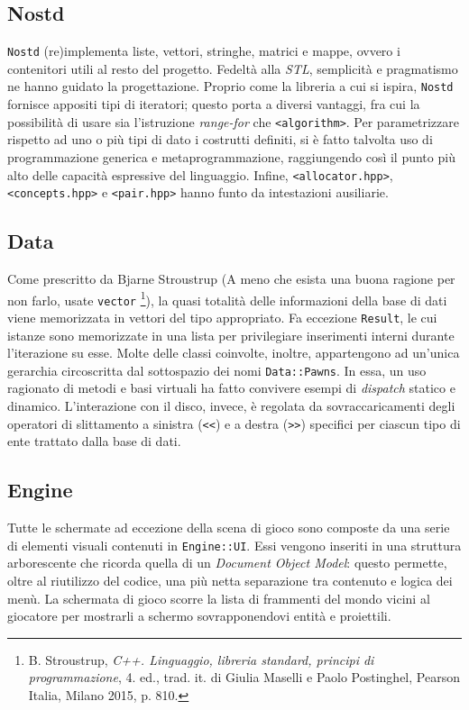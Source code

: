 \documentclass[a4paper]{article}
\begin{document}
\subsection{Nostd}

\verb!Nostd! (re)implementa liste, vettori, stringhe, matrici e mappe, ovvero i
contenitori utili al resto del progetto. Fedelt\`a alla \emph{STL}, semplicit\`a
e pragmatismo ne hanno guidato la progettazione. Proprio come la libreria a cui
si ispira, \verb!Nostd! fornisce appositi tipi di iteratori; questo porta a
diversi vantaggi, fra cui la possibilit\`a di usare sia l'istruzione
\emph{range-for} che \verb!<algorithm>!. Per parametrizzare rispetto ad uno o
pi\`u tipi di dato i costrutti definiti, si \`e fatto talvolta uso di
programmazione generica e metaprogrammazione, raggiungendo cos\`i il punto pi\`u
alto delle capacit\`a espressive del linguaggio. Infine, \verb!<allocator.hpp>!,
\verb!<concepts.hpp>! e \verb!<pair.hpp>! hanno funto da intestazioni
ausiliarie.

\subsection{Data}

Come prescritto da Bjarne Stroustrup (\guillemotleft A meno che esista una buona
ragione per non farlo, usate \verb!vector! \guillemotright \footnote{
\label{note2} B. Stroustrup, \emph{C++. Linguaggio, libreria standard, principi
di programmazione}, 4. ed., trad. it. di Giulia Maselli e Paolo Postinghel,
Pearson Italia, Milano 2015, p. 810.}), la quasi totalità delle informazioni
della base di dati viene memorizzata in vettori del tipo appropriato. Fa
eccezione \verb!Result!, le cui istanze sono memorizzate in una lista per
privilegiare inserimenti interni durante l'iterazione su esse. Molte delle
classi coinvolte, inoltre, appartengono ad un'unica gerarchia circoscritta dal
sottospazio dei nomi \verb!Data::Pawns!. In essa, un uso ragionato di metodi e
basi virtuali ha fatto convivere esempi di \emph{dispatch} statico e dinamico.
L'interazione con il disco, invece, \`e regolata da sovraccaricamenti degli
operatori di slittamento a sinistra (\verb!<<!) e a destra (\verb!>>!) specifici
per ciascun tipo di ente trattato dalla base di dati.

\subsection{Engine}

Tutte le schermate ad eccezione della scena di gioco sono composte da una serie
di elementi visuali contenuti in \verb!Engine::UI!. Essi vengono inseriti in una
struttura arborescente che ricorda quella di un \emph{Document Object Model}:
questo permette, oltre al riutilizzo del codice, una più netta separazione tra
contenuto e logica dei men\`u. La schermata di gioco scorre la lista di
frammenti del mondo vicini al giocatore per mostrarli a schermo sovrapponendovi
entit\`a e proiettili.
\end{document}
